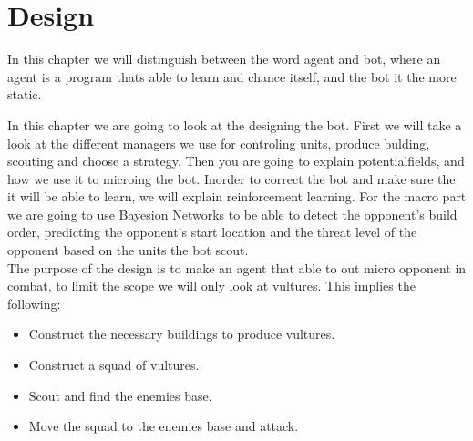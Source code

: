 \chapter{Design}\label{design}
	In this chapter we will distinguish between the word agent and bot, where an agent is a program thats able to learn and chance itself, and the bot it the more static.
	
	In this chapter we are going to look at the designing the bot. First we will take a look at the different managers we use for controling units, produce bulding, scouting and choose a strategy. Then you are going to explain potentialfields, and how we use it to microing the bot. Inorder to correct the bot and make sure the it will be able to learn, we will explain reinforcement learning. For the macro part we are going to use Bayesion Networks to be able to detect the opponent's build order, predicting the opponent's start location and the threat level of the opponent based on the units the bot scout.	\\
	The purpose of the design is to make an agent that able to out micro opponent in combat, to limit the scope we will only look at vultures. 
	This implies the following:
	\begin{itemize}
		\item Construct the necessary buildings to produce vultures.
		\item Construct a squad of vultures.
		\item Scout and find the enemies base.
		\item Move the squad to the enemies base and attack.
	\end{itemize}
	
	
	
	
	
	
	
